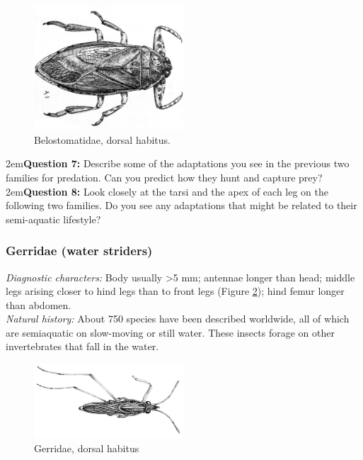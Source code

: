 \documentclass[letterpaper, 11pt]{article}
\begin{document}
\begin{figure}[ht!]
 \centering
 \includegraphics[width=0.5\textwidth]{belostomatidae.png}
 \caption{Belostomatidae, dorsal habitus. \citep[Modified from Fig.7:17 in ][]{bhlitem126080aquatic}}
 \label{fig:belostom1}
\end{figure}

\hangindent2em\textbf{Question 7:} Describe some of the adaptations you see in the previous two families for predation. Can you predict how they hunt and capture prey?\\

\hangindent2em\textbf{Question 8:} Look closely at the tarsi and the apex of each leg on the following two families. Do you see any adaptations that might be related to their semi-aquatic lifestyle?\\

\subsubsection{Gerridae (water striders)}
\noindent{}\textit{Diagnostic characters:} Body usually \textgreater5 mm; antennae longer than head; middle legs arising closer to hind legs than to front legs (Figure \ref{fig:gerrid1}); hind femur longer than abdomen.\\

\noindent{}\textit{Natural history:} About 750 species have been described worldwide, all of which are semiaquatic on slow-moving or still water. These insects forage on other invertebrates that fall in the water.\\

\begin{figure}[ht!]
 \centering
 \includegraphics[width=0.5\textwidth]{GerridHabitus}
 \caption{Gerridae, dorsal habitus \citep[][Plate 7, Fig. 12]{bhl37902}}
 \label{fig:gerrid1}
\end{figure}
\end{document}
